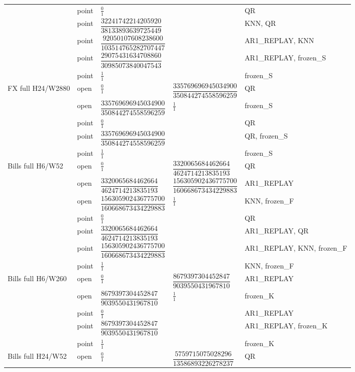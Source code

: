 \documentclass[11pt,a4paper]{article}
\begin{document}
\begin{longtable}{p{28mm}p{10mm}p{39mm}p{39mm}p{28mm}}
 & point & \(\frac{0}{1}\) &  & QR \\
 & point & \(\dfrac{32241742214205920}{38133893639725449}\) &  & KNN, QR \\
 & point & \(\dfrac{92050107608238600}{103514765282707447}\) &  & AR1\_REPLAY, KNN \\
 & point & \(\dfrac{29075431634708860}{30985073840047543}\) &  & AR1\_REPLAY, frozen\_S \\
 & point & \(\frac{1}{1}\) &  & frozen\_S \\
FX full H24/W2880 & open & \(\frac{0}{1}\) & \(\dfrac{335769696945034900}{350844274558596259}\) & QR \\
 & open & \(\dfrac{335769696945034900}{350844274558596259}\) & \(\frac{1}{1}\) & frozen\_S \\
 & point & \(\frac{0}{1}\) &  & QR \\
 & point & \(\dfrac{335769696945034900}{350844274558596259}\) &  & QR, frozen\_S \\
 & point & \(\frac{1}{1}\) &  & frozen\_S \\
Bills full H6/W52 & open & \(\frac{0}{1}\) & \(\dfrac{3320065684462664}{4624714213835193}\) & QR \\
 & open & \(\dfrac{3320065684462664}{4624714213835193}\) & \(\dfrac{156305902436775700}{160668673434229883}\) & AR1\_REPLAY \\
 & open & \(\dfrac{156305902436775700}{160668673434229883}\) & \(\frac{1}{1}\) & KNN, frozen\_F \\
 & point & \(\frac{0}{1}\) &  & QR \\
 & point & \(\dfrac{3320065684462664}{4624714213835193}\) &  & AR1\_REPLAY, QR \\
 & point & \(\dfrac{156305902436775700}{160668673434229883}\) &  & AR1\_REPLAY, KNN, frozen\_F \\
 & point & \(\frac{1}{1}\) &  & KNN, frozen\_F \\
Bills full H6/W260 & open & \(\frac{0}{1}\) & \(\dfrac{8679397304452847}{9039550431967810}\) & AR1\_REPLAY \\
 & open & \(\dfrac{8679397304452847}{9039550431967810}\) & \(\frac{1}{1}\) & frozen\_K \\
 & point & \(\frac{0}{1}\) &  & AR1\_REPLAY \\
 & point & \(\dfrac{8679397304452847}{9039550431967810}\) &  & AR1\_REPLAY, frozen\_K \\
 & point & \(\frac{1}{1}\) &  & frozen\_K \\
Bills full H24/W52 & open & \(\frac{0}{1}\) & \(\dfrac{5759715075028296}{13586893226278237}\) & QR \\

\end{longtable}
\end{document}
